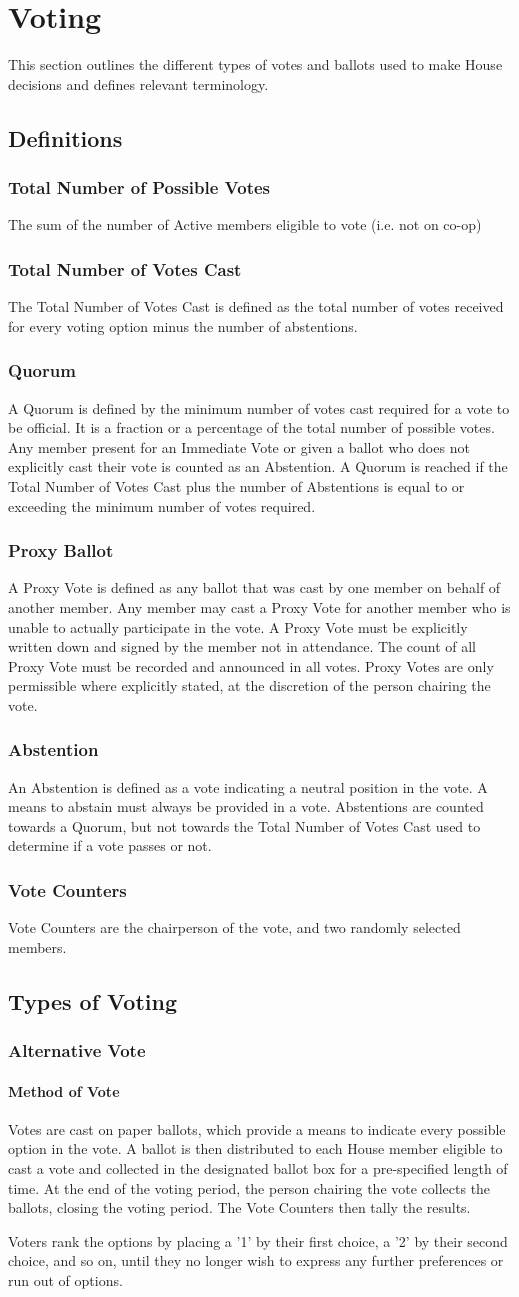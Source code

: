 \documentclass{article}
\newcommand{\article}[1]{\section{#1} \label{#1}}
\newcommand{\asection}[1]{\subsection{#1} \label{#1}}
\newcommand{\asubsection}[1]{\subsubsection{#1} \label{#1}}
\newcommand{\asubsubsection}[1]{\paragraph{#1} \label{#1}}
\begin{document}
\article{Voting}
This section outlines the different types of votes and ballots used to make House decisions and defines relevant terminology.
\asection{Definitions}
\asubsection{Total Number of Possible Votes}
The sum of the number of Active members eligible to vote (i.e. not on co-op)
\asubsection{Total Number of Votes Cast}
The Total Number of Votes Cast is defined as the total number of votes received for every voting option minus the number of abstentions.
\asubsection{Quorum}
A Quorum is defined by the minimum number of votes cast required for a vote to be official. It is a fraction or a percentage of the total number of possible votes. Any member present for an Immediate Vote or given a ballot who does not explicitly cast their vote is counted as an Abstention. A Quorum is reached if the Total Number of Votes Cast plus the number of Abstentions is equal to or exceeding the minimum number of votes required.
\asubsection{Proxy Ballot}
A Proxy Vote is defined as any ballot that was cast by one member on behalf of another member. Any member may cast a Proxy Vote for another member who is unable to actually participate in the vote. A Proxy Vote must be explicitly written down and signed by the member not in attendance. The count of all Proxy Vote must be recorded and announced in all votes. Proxy Votes are only permissible where explicitly stated, at the discretion of the person chairing the vote.
\asubsection{Abstention}
An Abstention is defined as a vote indicating a neutral position in the vote. A means to abstain must always be provided in a vote. Abstentions are counted towards a Quorum, but not towards the Total Number of Votes Cast used to determine if a vote passes or not.
\asubsection{Vote Counters}
Vote Counters are the chairperson of the vote, and two randomly selected members.

\asection{Types of Voting}
\asubsection{Alternative Vote}
\asubsubsection{Method of Vote}
Votes are cast on paper ballots, which provide a means to indicate every possible option in the vote. A ballot is then distributed to each House member eligible to cast a vote and collected in the designated ballot box for a pre-specified length of time. At the end of the voting period, the person chairing the vote collects the ballots, closing the voting period. The Vote Counters then tally the results.

Voters rank the options by placing a '1' by their first choice, a '2' by their second choice, and so on, until they no longer wish to express any further preferences or run out of options.
\end{document}
